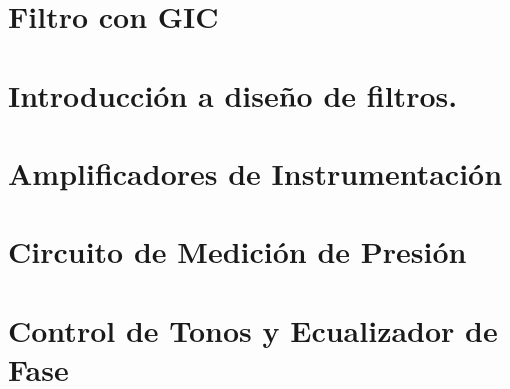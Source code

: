 







\tableofcontents
\newpage


\section{Filtro con GIC}
	
	\newpage

\section{Introducción a diseño de filtros.}
	
	\newpage
	
\section{Amplificadores de Instrumentación}
	\newpage
	
\section{Circuito de Medición de Presión}
	\newpage
	
\section{Control de Tonos y Ecualizador de Fase}
	
	\newpage
	
	\newpage
	
